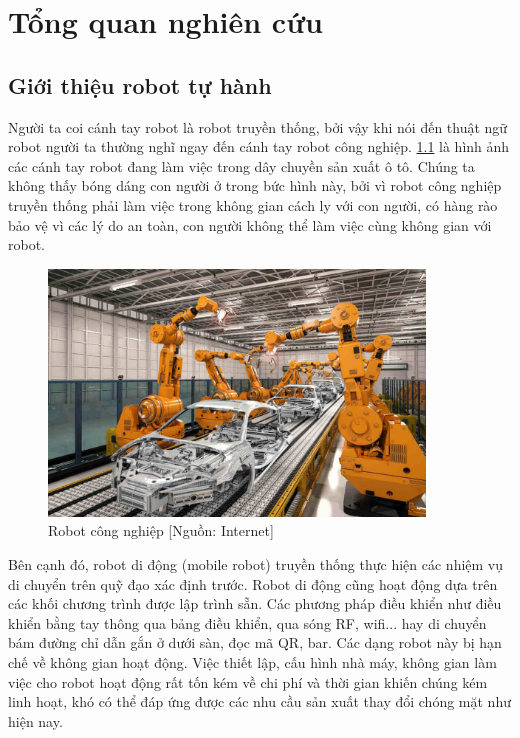 \chapter{Tổng quan nghiên cứu}
\label{chap:1tqnc}

\section{Giới thiệu robot tự hành}


%

Người ta coi cánh tay robot là robot truyền thống, bởi vậy khi nói đến thuật ngữ robot người ta thường nghĩ ngay đến cánh tay robot công nghiệp. \figurename{ \ref{fig:RBCongNghiep}} là hình ảnh các cánh tay robot đang làm việc trong dây chuyền sản xuất ô tô. Chúng ta không thấy bóng dáng con người ở trong bức hình này, bởi vì robot công nghiệp truyền thống phải làm việc trong không gian cách ly với con người, có hàng rào bảo vệ vì các lý do an toàn, con người không thể làm việc cùng không gian với robot.

\begin{figure}[hpt]
  \centering
  \includegraphics[width=10cm]{figures/IndustrialRobot.jpg}
  \caption{Robot công nghiệp [Nguồn: Internet]}
  \label{fig:RBCongNghiep}
\end{figure}

Bên cạnh đó, robot di động (mobile robot) truyền thống thực hiện các nhiệm vụ di chuyển trên quỹ đạo xác định trước. Robot di động cũng hoạt động dựa trên các khối chương trình được lập trình sẵn. Các phương pháp điều khiển như điều khiển bằng tay thông qua bảng điều khiển, qua sóng RF, wifi... hay di chuyển bám đường chỉ dẫn gắn ở dưới sàn, đọc mã QR, bar. Các dạng robot này bị hạn chế về không gian hoạt động. Việc thiết lập, cấu hình nhà máy, không gian làm việc cho robot hoạt động rất tốn kém về chi phí và thời gian khiến chúng kém linh hoạt, khó có thể đáp ứng được các nhu cầu sản xuất thay đổi chóng mặt như hiện nay.

